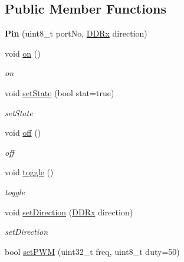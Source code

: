 \subsection*{Public Member Functions}
\begin{DoxyCompactItemize}
\item 
\mbox{\label{classPin_a5a77b8b0c99771c11582f0a011496e6b}} 
{\bfseries Pin} (uint8\+\_\+t port\+No, \hyperlink{portmanager_8h_a63d6a5e91a2b1a4156b6c0466f828554}{D\+D\+Rx} direction)
\item 
\mbox{\label{classPin_ae562d4913700a9af64086bc0bad95a28}} 
void \hyperlink{classPin_ae562d4913700a9af64086bc0bad95a28}{on} ()
\begin{DoxyCompactList}\small\item\em on \end{DoxyCompactList}\item 
void \hyperlink{classPin_a2488d5db01d0bae6d5fe8932b39d3bbe}{set\+State} (bool stat=true)
\begin{DoxyCompactList}\small\item\em set\+State \end{DoxyCompactList}\item 
\mbox{\label{classPin_aa568e83b313f1b9f66bb50f66f18e62c}} 
void \hyperlink{classPin_aa568e83b313f1b9f66bb50f66f18e62c}{off} ()
\begin{DoxyCompactList}\small\item\em off \end{DoxyCompactList}\item 
\mbox{\label{classPin_a5ecffd86fb366af5ff559faf82a1fc81}} 
void \hyperlink{classPin_a5ecffd86fb366af5ff559faf82a1fc81}{toggle} ()
\begin{DoxyCompactList}\small\item\em toggle \end{DoxyCompactList}\item 
void \hyperlink{classPin_a49a4bc8df0fad82b4799fa19da708f12}{set\+Direction} (\hyperlink{portmanager_8h_a63d6a5e91a2b1a4156b6c0466f828554}{D\+D\+Rx} direction)
\begin{DoxyCompactList}\small\item\em set\+Direction \end{DoxyCompactList}\item 
bool \hyperlink{classPin_ae3b0862a7ec9b11f7a8986024669e25a}{set\+P\+WM} (uint32\+\_\+t freq, uint8\+\_\+t duty=50)

\end{DoxyCompactItemize}
